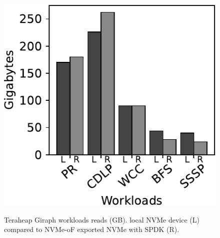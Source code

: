 \vspace{10em}
\begin{figure}[H]
  \includegraphics[width=\linewidth]{figures/giraph_r.pdf}\\
\caption{Teraheap Giraph workloads reads (GB). local NVMe device (L) compared to NVMe-oF exported NVMe with SPDK (R).}
\label{fig:giraph_r}
\end{figure}

